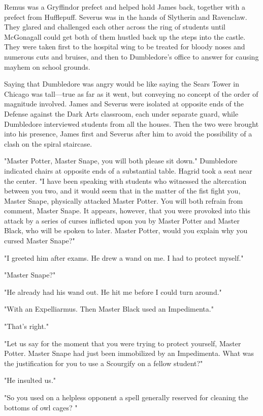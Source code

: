 Remus was a Gryffindor prefect and helped hold James back, together with a prefect from Hufflepuff. Severus was in the hands of Slytherin and Ravenclaw. They glared and challenged each other across the ring of students until McGonagall could get both of them hustled back up the steps into the castle. They were taken first to the hospital wing to be treated for bloody noses and numerous cuts and bruises, and then to Dumbledore's office to answer for causing mayhem on school grounds.

Saying that Dumbledore was angry would be like saying the Sears Tower in Chicago was tall—true as far as it went, but conveying no concept of the order of magnitude involved. James and Severus were isolated at opposite ends of the Defense against the Dark Arts classroom, each under separate guard, while Dumbledore interviewed students from all the houses. Then the two were brought into his presence, James first and Severus after him to avoid the possibility of a clash on the spiral staircase.

"Master Potter, Master Snape, you will both please sit down." Dumbledore indicated chairs at opposite ends of a substantial table. Hagrid took a seat near the center. "I have been speaking with students who witnessed the altercation between you two, and it would seem that in the matter of the fist fight you, Master Snape, physically attacked Master Potter. You will both refrain from comment, Master Snape. It appears, however, that you were provoked into this attack by a series of curses inflicted upon you by Master Potter and Master Black, who will be spoken to later. Master Potter, would you explain why you cursed Master Snape?"

"I greeted him after exams. He drew a wand on me. I had to protect myself."

"Master Snape?"

"He already had his wand out. He hit me before I could turn around."

"With an Expelliarmus. Then Master Black used an Impedimenta."

"That's right."

"Let us say for the moment that you were trying to protect yourself, Master Potter. Master Snape had just been immobilized by an Impedimenta. What was the justification for you to use a Scourgify on a fellow student?"

"He insulted us."

"So you used on a helpless opponent a spell generally reserved for cleaning the bottoms of owl cages? "

